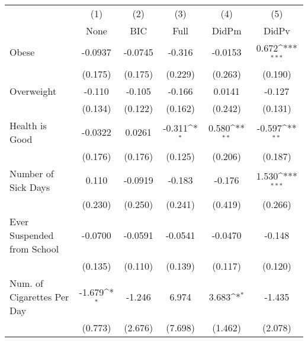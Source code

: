 {
\def\sym#1{\ifmmode^{#1}\else\(^{#1}\)\fi}
\begin{tabular}{l*{5}{c}}
\toprule
            &\multicolumn{1}{c}{(1)}&\multicolumn{1}{c}{(2)}&\multicolumn{1}{c}{(3)}&\multicolumn{1}{c}{(4)}&\multicolumn{1}{c}{(5)}\\
            &\multicolumn{1}{c}{None}&\multicolumn{1}{c}{BIC}&\multicolumn{1}{c}{Full}&\multicolumn{1}{c}{DidPm}&\multicolumn{1}{c}{DidPv}\\
\midrule
Obese       &     -0.0937         &     -0.0745         &      -0.316         &     -0.0153         &       0.672\sym{***}\\
            &     (0.175)         &     (0.175)         &     (0.229)         &     (0.263)         &     (0.190)         \\
\addlinespace
Overweight  &      -0.110         &      -0.105         &      -0.166         &      0.0141         &      -0.127         \\
            &     (0.134)         &     (0.122)         &     (0.162)         &     (0.242)         &     (0.131)         \\
\addlinespace
Health is Good&     -0.0322         &      0.0261         &      -0.311\sym{*}  &       0.580\sym{**} &      -0.597\sym{**} \\
            &     (0.176)         &     (0.176)         &     (0.125)         &     (0.206)         &     (0.187)         \\
\addlinespace
Number of Sick Days&       0.110         &     -0.0919         &      -0.183         &      -0.176         &       1.530\sym{***}\\
            &     (0.230)         &     (0.250)         &     (0.241)         &     (0.419)         &     (0.266)         \\
\addlinespace
Ever Suspended from School&     -0.0700         &     -0.0591         &     -0.0541         &     -0.0470         &      -0.148         \\
            &     (0.135)         &     (0.110)         &     (0.139)         &     (0.117)         &     (0.120)         \\
\addlinespace
Num. of Cigarettes Per Day&      -1.679\sym{*}  &      -1.246         &       6.974         &       3.683\sym{*}  &      -1.435         \\
            &     (0.773)         &     (2.676)         &     (7.698)         &     (1.462)         &     (2.078)         \\
\bottomrule
\end{tabular}
}

